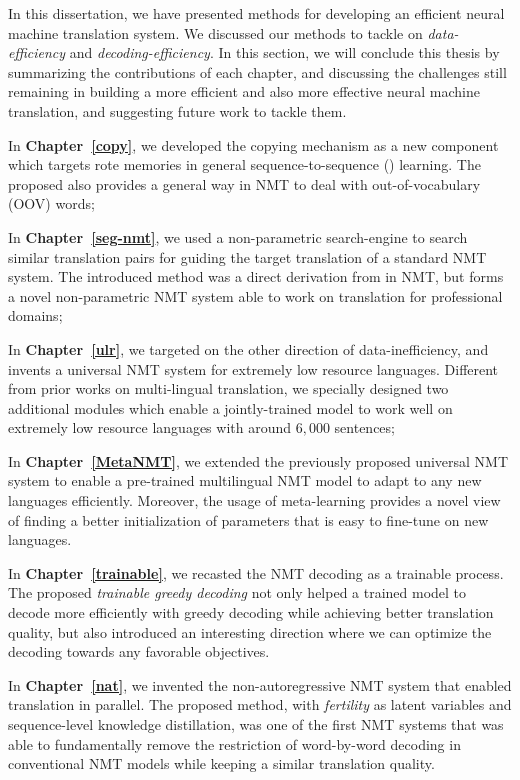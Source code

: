 In this dissertation, we have presented methods for developing an efficient neural machine translation system. 
We discussed  our methods to tackle on {\it data-efficiency} and {\it decoding-efficiency}.
In this section, we will conclude this thesis by summarizing the contributions of each chapter, and discussing the challenges still remaining in building a more efficient and also more effective neural machine translation, and suggesting future work to tackle them.

In \textbf{Chapter~\ref{copy}}, we developed the copying mechanism as a new component  which targets rote memories in general sequence-to-sequence (\sts) learning. The proposed \copynet also provides a general way in NMT to deal with out-of-vocabulary (OOV) words; 

In \textbf{Chapter~\ref{seg-nmt}}, we used a non-parametric search-engine to search similar translation pairs for guiding the target translation of a standard NMT system. The introduced method was a direct derivation from \copynet in NMT, but forms a novel non-parametric NMT system  able to work on translation for professional domains; 

In \textbf{Chapter~\ref{ulr}}, we targeted on the other direction of data-inefficiency, and invents a universal NMT system for extremely low resource languages. Different from prior works on multi-lingual translation, we specially designed two additional modules which enable a jointly-trained model to work well on extremely low resource languages with around $6,000$ sentences; 

In \textbf{Chapter~\ref{MetaNMT}}, we extended the previously proposed universal NMT system to enable a pre-trained multilingual NMT model to adapt to any new languages efficiently. Moreover, the usage of meta-learning provides a  novel  view of finding a better initialization of parameters that is easy to fine-tune on new languages.

In \textbf{Chapter~\ref{trainable}}, we recasted the NMT decoding as a trainable process. The proposed {\it trainable greedy decoding} not only helped a trained model to decode more efficiently with greedy decoding while achieving better translation quality, but also introduced an interesting direction where we can optimize the decoding towards any favorable objectives.

In \textbf{Chapter~\ref{nat}}, we invented the non-autoregressive NMT system that enabled translation in parallel. The proposed method, with {\it fertility} as latent variables and sequence-level knowledge distillation, was one of the first NMT systems that was able to fundamentally remove the restriction of word-by-word decoding in conventional NMT models while keeping a similar translation quality.

